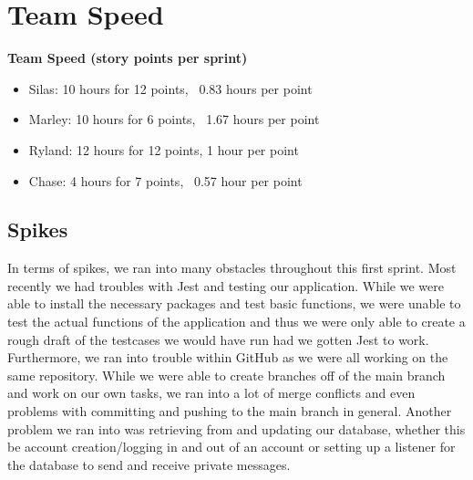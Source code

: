 \section{Team Speed}
\textbf{Team Speed (story points per sprint)}
\begin{itemize}
    \item Silas: 10 hours for 12 points, ~0.83 hours per point
    \item Marley: 10 hours for 6 points, ~1.67 hours per point
    \item Ryland: 12 hours for 12 points, 1 hour per point
    \item Chase: 4 hours for 7 points, ~0.57 hour per point
\end{itemize}

\subsection{Spikes}
In terms of spikes, we ran into many obstacles throughout this first sprint. Most recently we had troubles with Jest and testing our application. While we were able to install the necessary packages and test basic functions, we were unable to test the actual functions of the application and thus we were only able to create a rough draft of the testcases we would have run had we gotten Jest to work. Furthermore, we ran into trouble within GitHub as we were all working on the same repository. While we were able to create branches off of the main branch and work on our own tasks, we ran into a lot of merge conflicts and even problems with committing and pushing to the main branch in general. Another problem we ran into was retrieving from and updating our database, whether this be account creation/logging in and out of an account or setting up a listener for the database to send and receive private messages.